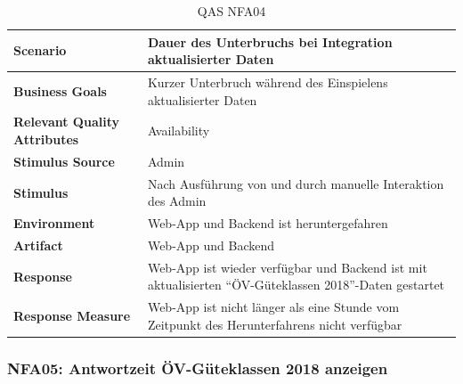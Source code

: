\begin{table}[H]
    \begin{tabular}{l p{10.6cm}}
        \toprule
        \textbf{Scenario}
                                & Dauer des Unterbruchs bei Integration aktualisierter Daten\\
        \midrule
        \textbf{Business Goals}
                                & Kurzer Unterbruch während des Einspielens aktualisierter Daten\\
        \textbf{Relevant Quality Attributes}
                                & Availability \\
        \textbf{Stimulus Source}
                                & Admin\\
        \textbf{Stimulus}
                                & Nach Ausführung von \nameref{Use Cases:UC01} und \nameref{Use Cases:UC05} durch manuelle Interaktion des Admin\\
        \textbf{Environment}
                                & Web-App und Backend ist heruntergefahren\\
        \textbf{Artifact}
                                & Web-App und Backend\\
        \textbf{Response}
                                & Web-App ist wieder verfügbar und Backend ist mit aktualisierten "`ÖV-Güteklassen 2018"'-Daten gestartet\\  
        \textbf{Response Measure}
                                & Web-App ist nicht länger als eine Stunde vom Zeitpunkt des Herunterfahrens nicht verfügbar\\                                
        \bottomrule
    \end{tabular}
    \caption{QAS NFA04}
    \label{table:nfa04}
\end{table}

\subsubsection{NFA05: Antwortzeit ÖV-Güteklassen 2018 anzeigen}
\label{NFA:NFA05}

